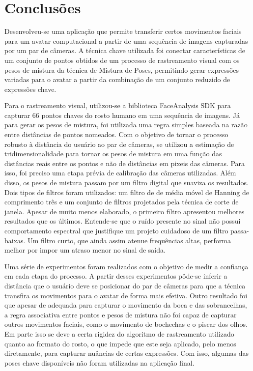 \chapter{Conclusões}

\label{CapConclusoes}

Desenvolveu-se uma aplicação que permite transferir certos movimentos faciais para um avatar computacional a partir de uma sequência de imagens capturadas por um par de câmeras. A técnica chave utilizada foi conectar características de um conjunto de pontos obtidos de um processo de rastreamento visual com os pesos de mistura da técnica de Mistura de Poses, permitindo gerar expressões variadas para o avatar a partir da combinação de um conjunto reduzido de expressões chave. 

Para o rastreamento visual, utilizou-se a biblioteca FaceAnalysis SDK para capturar 66 pontos chaves do rosto humano em uma sequência de imagens. Já para gerar os pesos de mistura, foi utilizada uma regra simples baseada na razão entre distâncias de pontos nomeados. Com o objetivo de tornar o processo robusto à distância do usuário ao par de câmeras, se utilizou a estimação de tridimensionalidade para tornar os pesos de mistura em uma função das distâncias reais entre os pontos e não de distâncias em pixeis das câmeras. Para isso, foi preciso uma etapa prévia de calibração das câmeras utilizadas. Além disso, os pesos de mistura passam por um filtro digital que suaviza os resultados. Dois tipos de filtros foram utilizados: um filtro de de média móvel de Hanning de comprimento três e um conjunto de filtros projetados pela técnica de corte de janela.  Apesar de muito menos elaborado, o primeiro filtro apresentou melhores resultados que os últimos. Entende-se que o ruído presente no sinal não possui comportamento espectral que justifique um projeto cuidadoso de um filtro passa-baixas. Um filtro curto, que ainda assim atenue frequências altas, performa melhor por impor um atraso menor no sinal de saída.

Uma série de experimentos foram realizados com o objetivo de medir a confiança em cada etapa do processo. A partir desses experimentos pôde-se inferir a distância que o usuário deve se posicionar do par de câmeras para que a técnica transfira os movimentos para o avatar de forma mais efetiva. Outro resultado foi que apesar de adequada para capturar o movimento da boca e das sobrancelhas, a regra associativa entre pontos e pesos de mistura não foi capaz de capturar outros movimentos faciais, como o movimento de bochechas e o piscar dos olhos. Em parte isso se deve a certa rigidez do algoritmo de rastreamento utilizado quanto ao formato do rosto, o que impede que este seja aplicado, pelo menos diretamente, para capturar nuâncias de certas expressões. Com isso, algumas das poses chave disponíveis não foram utilizadas na aplicação final.

